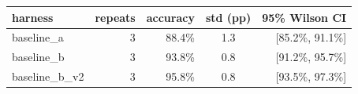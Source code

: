 \begin{tabular}{lrrcr}
\toprule
harness & repeats & accuracy & std (pp) & 95\% Wilson CI \\
\midrule
baseline\_a & 3 & 88.4\% & 1.3 & [85.2\%, 91.1\%] \\
baseline\_b & 3 & 93.8\% & 0.8 & [91.2\%, 95.7\%] \\
baseline\_b\_v2 & 3 & 95.8\% & 0.8 & [93.5\%, 97.3\%] \\
\bottomrule
\end{tabular}
